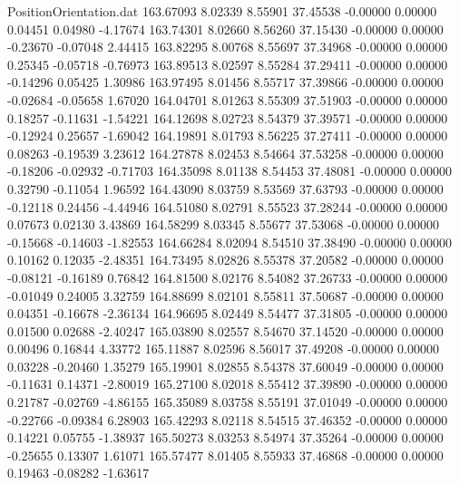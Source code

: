 \begin{filecontents}{PositionOrientation.dat}
 163.67093    8.02339    8.55901    37.45538   -0.00000    0.00000    0.04451    0.04980   -4.17674
 163.74301    8.02660    8.56260    37.15430   -0.00000    0.00000   -0.23670   -0.07048    2.44415
 163.82295    8.00768    8.55697    37.34968   -0.00000    0.00000    0.25345   -0.05718   -0.76973
 163.89513    8.02597    8.55284    37.29411   -0.00000    0.00000   -0.14296    0.05425    1.30986
 163.97495    8.01456    8.55717    37.39866   -0.00000    0.00000   -0.02684   -0.05658    1.67020
 164.04701    8.01263    8.55309    37.51903   -0.00000    0.00000    0.18257   -0.11631   -1.54221
 164.12698    8.02723    8.54379    37.39571   -0.00000    0.00000   -0.12924    0.25657   -1.69042
 164.19891    8.01793    8.56225    37.27411   -0.00000    0.00000    0.08263   -0.19539    3.23612
 164.27878    8.02453    8.54664    37.53258   -0.00000    0.00000   -0.18206   -0.02932   -0.71703
 164.35098    8.01138    8.54453    37.48081   -0.00000    0.00000    0.32790   -0.11054    1.96592
 164.43090    8.03759    8.53569    37.63793   -0.00000    0.00000   -0.12118    0.24456   -4.44946
 164.51080    8.02791    8.55523    37.28244   -0.00000    0.00000    0.07673    0.02130    3.43869
 164.58299    8.03345    8.55677    37.53068   -0.00000    0.00000   -0.15668   -0.14603   -1.82553
 164.66284    8.02094    8.54510    37.38490   -0.00000    0.00000    0.10162    0.12035   -2.48351
 164.73495    8.02826    8.55378    37.20582   -0.00000    0.00000   -0.08121   -0.16189    0.76842
 164.81500    8.02176    8.54082    37.26733   -0.00000    0.00000   -0.01049    0.24005    3.32759
 164.88699    8.02101    8.55811    37.50687   -0.00000    0.00000    0.04351   -0.16678   -2.36134
 164.96695    8.02449    8.54477    37.31805   -0.00000    0.00000    0.01500    0.02688   -2.40247
 165.03890    8.02557    8.54670    37.14520   -0.00000    0.00000    0.00496    0.16844    4.33772
 165.11887    8.02596    8.56017    37.49208   -0.00000    0.00000    0.03228   -0.20460    1.35279
 165.19901    8.02855    8.54378    37.60049   -0.00000    0.00000   -0.11631    0.14371   -2.80019
 165.27100    8.02018    8.55412    37.39890   -0.00000    0.00000    0.21787   -0.02769   -4.86155
 165.35089    8.03758    8.55191    37.01049   -0.00000    0.00000   -0.22766   -0.09384    6.28903
 165.42293    8.02118    8.54515    37.46352   -0.00000    0.00000    0.14221    0.05755   -1.38937
 165.50273    8.03253    8.54974    37.35264   -0.00000    0.00000   -0.25655    0.13307    1.61071
 165.57477    8.01405    8.55933    37.46868   -0.00000    0.00000    0.19463   -0.08282   -1.63617

\end{filecontents}
